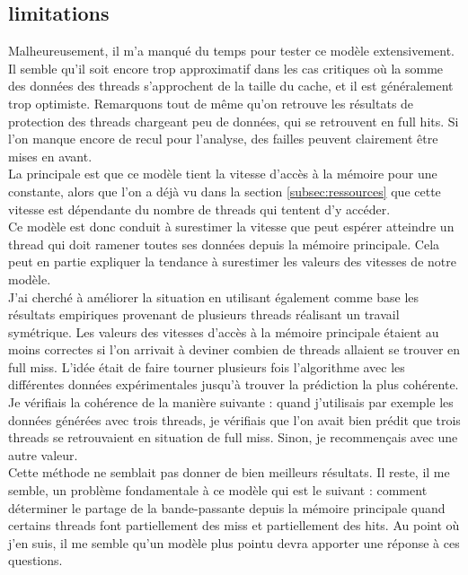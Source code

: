 \documentclass{report}
\begin{document}
\subsection{limitations}
Malheureusement, il m'a manqué du temps pour tester ce modèle extensivement. Il semble qu'il soit encore
trop approximatif dans les cas critiques où la somme des données des threads s'approchent de la taille 
du cache, et il est généralement trop optimiste. Remarquons tout de même qu'on retrouve les résultats
de protection des threads chargeant peu de données, qui se retrouvent en full hits. Si l'on manque 
encore de recul pour l'analyse, des failles peuvent clairement être mises en avant.
\\La principale est que ce modèle tient la vitesse d'accès à la mémoire pour une constante, alors que 
l'on a déjà vu dans la section \ref{subsec:ressources} que cette vitesse est dépendante du nombre 
de threads qui tentent d'y accéder. 
\\Ce modèle est donc conduit à surestimer la vitesse que peut espérer atteindre un thread qui doit
ramener toutes ses données depuis la mémoire principale. Cela peut en partie expliquer la tendance
à surestimer les valeurs des vitesses de notre modèle.
\\J'ai cherché à améliorer la situation en utilisant également comme base les résultats empiriques
provenant de plusieurs threads réalisant un travail symétrique. Les valeurs des vitesses d'accès à
la mémoire principale étaient au moins correctes si l'on arrivait à deviner combien de threads 
allaient se trouver en full miss. L'idée était de faire tourner plusieurs fois l'algorithme avec 
les différentes données expérimentales jusqu'à trouver la prédiction la plus cohérente. Je vérifiais
la cohérence de la manière suivante : quand j'utilisais par exemple les données générées avec
trois threads, je vérifiais que l'on avait bien prédit que trois threads se retrouvaient en situation
de full miss. Sinon, je recommençais avec une autre valeur. 
\\Cette méthode ne semblait pas donner de bien meilleurs résultats. Il reste, il me semble, un problème
fondamentale à ce modèle qui est le suivant : comment déterminer le partage de la bande-passante 
depuis la mémoire principale quand certains threads font partiellement des miss et partiellement 
des hits. Au point où j'en suis, il me semble qu'un modèle plus pointu devra apporter une réponse
à ces questions.
\end{document}
